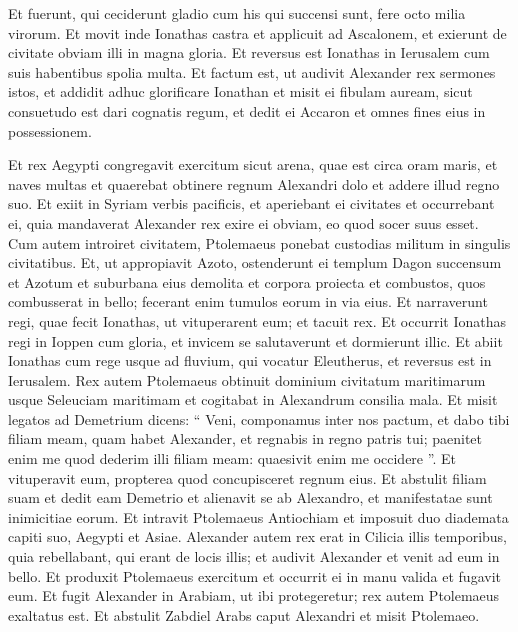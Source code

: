 \begin{biblechapter}
\begin{biblechapter}
\begin{biblechapter}
\begin{biblechapter}
\begin{biblechapter}
\begin{biblechapter}
\begin{biblechapter}
\begin{biblechapter}
\begin{biblechapter}
\begin{biblechapter}
\verse Et fuerunt, qui ceciderunt gladio cum his qui succensi sunt, fere octo milia virorum. 
\verse Et movit inde Ionathas castra et applicuit ad Ascalonem, et exierunt de civitate obviam illi in magna gloria. 
\verse Et reversus est Ionathas in Ierusalem cum suis habentibus spolia multa. 
\verse Et factum est, ut audivit Alexander rex sermones istos, et addidit adhuc glorificare Ionathan 
 \verse et misit ei fibulam auream, sicut consuetudo est dari cognatis regum, et dedit ei Accaron et omnes fines eius in possessionem.
 
\begin{biblechapter}
\verse Et rex Aegypti congregavit exercitum sicut arena, quae est circa oram maris, et naves multas et quaerebat obtinere regnum Alexandri dolo et addere illud regno suo. 
\verse Et exiit in Syriam verbis pacificis, et aperiebant ei civitates et occurrebant ei, quia mandaverat Alexander rex exire ei obviam, eo quod socer suus esset. 
\verse Cum autem introiret civitatem, Ptolemaeus ponebat custodias militum in singulis civitatibus. 
\verse Et, ut appropiavit Azoto, ostenderunt ei templum Dagon succensum et Azotum et suburbana eius demolita et corpora proiecta et combustos, quos combusserat in bello; fecerant enim tumulos eorum in via eius. 
\verse Et narraverunt regi, quae fecit Ionathas, ut vituperarent eum; et tacuit rex. 
\verse Et occurrit Ionathas regi in Ioppen cum gloria, et invicem se salutaverunt et dormierunt illic. 
\verse Et abiit Ionathas cum rege usque ad fluvium, qui vocatur Eleutherus, et reversus est in Ierusalem. 
 \verse Rex autem Ptolemaeus obtinuit dominium civitatum maritimarum usque Seleuciam maritimam et cogitabat in Alexandrum consilia mala. 
\verse Et misit legatos ad Demetrium dicens: “ Veni, componamus inter nos pactum, et dabo tibi filiam meam, quam habet Alexander, et regnabis in regno patris tui; 
\verse paenitet enim me quod dederim illi filiam meam: quaesivit enim me occidere ”. 
\verse Et vituperavit eum, propterea quod concupisceret regnum eius. 
\verse Et abstulit filiam suam et dedit eam Demetrio et alienavit se ab Alexandro, et manifestatae sunt inimicitiae eorum. 
\verse Et intravit Ptolemaeus Antiochiam et imposuit duo diademata capiti suo, Aegypti et Asiae. 
\verse Alexander autem rex erat in Cilicia illis temporibus, quia rebellabant, qui erant de locis illis; 
\verse et audivit Alexander et venit ad eum in bello. Et produxit Ptolemaeus exercitum et occurrit ei in manu valida et fugavit eum. 
\verse Et fugit Alexander in Arabiam, ut ibi protegeretur; rex autem Ptolemaeus exaltatus est. 
\verse Et abstulit Zabdiel Arabs caput Alexandri et misit Ptolemaeo. 

\end{biblechapter}
\end{biblechapter}
\end{biblechapter}
\end{biblechapter}
\end{biblechapter}
\end{biblechapter}
\end{biblechapter}
\end{biblechapter}
\end{biblechapter}
\end{biblechapter}
\end{biblechapter}
